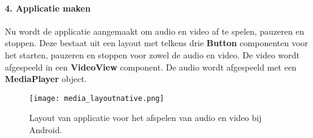 \paragraph{4. Applicatie maken}
Nu wordt de applicatie aangemaakt om audio en video af te spelen, pauzeren en
stoppen. Deze bestaat uit een layout met telkens drie \textbf{Button} componenten 
voor het starten, pauzeren en stoppen voor zowel de audio en video. De video 
wordt afgespeeld in een \textbf{VideoView} component. De audio wordt afgespeeld
met een \textbf{MediaPlayer} object.
\begin{figure}[H]
    \centering
    \texttt{[image: media\_layoutnative.png]}
    \caption{Layout van applicatie voor het afspelen van audio en video bij Android.}
\end{figure}




